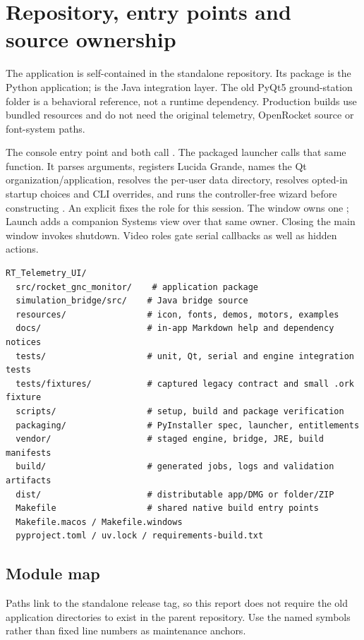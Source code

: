 \section{Repository, entry points and source ownership}\label{sec:repo}
The application is self-contained in the standalone  repository. Its
 package is the Python application;
 is the Java integration layer.
The old PyQt5 ground-station folder is a behavioral reference, not a runtime
dependency. Production builds use bundled resources and do not need the original
telemetry, OpenRocket source or font-system paths.

The console entry point  and
 both call .
The packaged launcher calls that same function. It parses arguments, registers
Lucida Grande, names the Qt organization/application, resolves the per-user data
directory, resolves opted-in startup choices and CLI overrides, and runs the controller-free
wizard before constructing . An explicit 
fixes the role for this session. The window owns one ; Launch
adds a companion Systems view over that same owner. Closing the main window
invokes shutdown. Video roles gate serial callbacks as well as hidden actions.

\begin{lstlisting}
RT_Telemetry_UI/
  src/rocket_gnc_monitor/    # application package
  simulation_bridge/src/    # Java bridge source
  resources/                # icon, fonts, demos, motors, examples
  docs/                     # in-app Markdown help and dependency notices
  tests/                    # unit, Qt, serial and engine integration tests
  tests/fixtures/           # captured legacy contract and small .ork fixture
  scripts/                  # setup, build and package verification
  packaging/                # PyInstaller spec, launcher, entitlements
  vendor/                   # staged engine, bridge, JRE, build manifests
  build/                    # generated jobs, logs and validation artifacts
  dist/                     # distributable app/DMG or folder/ZIP
  Makefile                  # shared native build entry points
  Makefile.macos / Makefile.windows
  pyproject.toml / uv.lock / requirements-build.txt
\end{lstlisting}

\subsection{Module map}
Paths link to the standalone release tag, so this report does not require
the old application directories to exist in the parent repository. Use the named symbols rather than fixed line numbers as
maintenance anchors.

